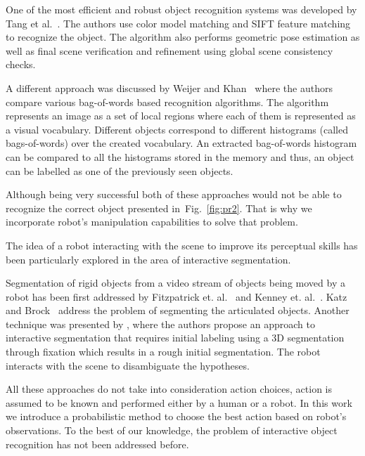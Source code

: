 \documentclass[conference]{IEEEtran}
\newcommand{\figref}[1]{Fig.~\ref{#1}}
\begin{document}
	One of the most efficient and robust object recognition systems was developed by Tang et al.~\cite{tang2012textured}. The authors use color model matching and SIFT feature matching to recognize the object. The algorithm also performs geometric pose estimation as well as final scene verification and refinement using global scene consistency checks. 

    A different approach was discussed by Weijer and Khan~\cite{van2013fusing} where the authors compare various bag-of-words based recognition algorithms. The algorithm represents an image as a set of local regions where each of them is represented as a visual vocabulary. Different objects correspond to different histograms (called bags-of-words) over the created vocabulary. An extracted bag-of-words histogram can be compared to all the histograms stored in the memory and thus, an object can be labelled as one of the previously seen objects.

    Although being very successful both of these approaches would not be able to recognize the correct object presented in~\figref{fig:pr2}. That is why we incorporate robot's manipulation capabilities to solve that problem.

    The idea of a robot interacting with the scene to improve its perceptual skills has been particularly explored in the area of interactive segmentation.

    Segmentation of rigid objects from a video stream of objects being moved by a robot has been first addressed by Fitzpatrick et. al.~\cite{fitzpatrick_active_vision} and Kenney et. al.~\cite{KenneyInteractive}. Katz and Brock~\cite{Katz-WS-MM-ICRA2011} address the problem of segmenting the articulated objects. Another technique was presented by \cite{bergstrom11icvs}, where the authors propose  an   approach  to interactive  segmentation that  requires initial  labeling using  a 3D segmentation  through  fixation  which  results  in  a  rough  initial segmentation. The robot interacts with the scene to disambiguate the hypotheses.


    All these approaches do not take into consideration action choices, action is assumed to be known and performed either by a human or a robot. In this work we introduce a probabilistic method to choose the best action based on robot's observations. To the best of our knowledge, the problem of interactive object recognition has not been addressed before. 
\end{document}
